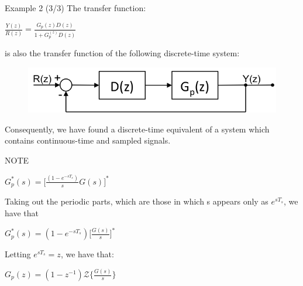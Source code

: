 \begin{frame}
	\begin{exampleblock}{Example 2 (3/3)}
		\justify		
		The transfer function:
		\begin{center}
			$\frac{Y(z)}{R(z)} = \frac{G_p(z)D(z)}{1 +  G_p^(z)D(z)}$
		\end{center}
		is also the transfer function of the following discrete-time system:
		\begin{figure}
			\centering
			\includegraphics[width=0.8\linewidth]{block_analysis_3}
		\end{figure}
		Consequently, we have found a discrete-time equivalent of a system which contains continuous-time and sampled signals.
	\end{exampleblock}
\end{frame}

\begin{frame}
	\begin{alertblock}{NOTE}
	\begin{center}
		$G_p^{*}(s) = \big[ \frac{(1 - e^{-sT_s})}{s} G(s) \big]^{*}$
	\end{center}
	Taking out the periodic parts, which are those in which s appears only as $e^{sT_s}$, we have that
	\begin{center}
		$G_p^{*}(s) = (1 - e^{-sT_s}) \big[ \frac{G(s)}{s} \big]^{*}$
	\end{center}
	Letting $e^{sT_s} = z$, we have that:
	\begin{center}
		$G_p(z) = (1-z^{-1}) \mathcal{Z} \big\{ \frac{G(s)}{s} \big\}$
	\end{center}
	\end{alertblock}
\end{frame}